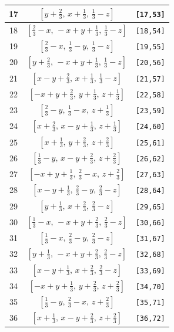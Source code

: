 \documentclass[fleqn,8pt]{jsarticle}
\begin{document}
\begin{longtable}{ccc}
17 & $\left[ y + \frac{2}{3},\, x + \frac{1}{3},\, \frac{1}{3} - z \right]$ & {\tt [17,53]} \\ \hline
18 & $\left[ \frac{2}{3} - x,\, - x + y + \frac{1}{3},\, \frac{1}{3} - z \right]$ & {\tt [18,54]} \\ \hline
19 & $\left[ \frac{2}{3} - x,\, \frac{1}{3} - y,\, \frac{1}{3} - z \right]$ & {\tt [19,55]} \\ \hline
20 & $\left[ y + \frac{2}{3},\, - x + y + \frac{1}{3},\, \frac{1}{3} - z \right]$ & {\tt [20,56]} \\ \hline
21 & $\left[ x - y + \frac{2}{3},\, x + \frac{1}{3},\, \frac{1}{3} - z \right]$ & {\tt [21,57]} \\ \hline
22 & $\left[ - x + y + \frac{2}{3},\, y + \frac{1}{3},\, z + \frac{1}{3} \right]$ & {\tt [22,58]} \\ \hline
23 & $\left[ \frac{2}{3} - y,\, \frac{1}{3} - x,\, z + \frac{1}{3} \right]$ & {\tt [23,59]} \\ \hline
24 & $\left[ x + \frac{2}{3},\, x - y + \frac{1}{3},\, z + \frac{1}{3} \right]$ & {\tt [24,60]} \\ \hline
25 & $\left[ x + \frac{1}{3},\, y + \frac{2}{3},\, z + \frac{2}{3} \right]$ & {\tt [25,61]} \\ \hline
26 & $\left[ \frac{1}{3} - y,\, x - y + \frac{2}{3},\, z + \frac{2}{3} \right]$ & {\tt [26,62]} \\ \hline
27 & $\left[ - x + y + \frac{1}{3},\, \frac{2}{3} - x,\, z + \frac{2}{3} \right]$ & {\tt [27,63]} \\ \hline
28 & $\left[ x - y + \frac{1}{3},\, \frac{2}{3} - y,\, \frac{2}{3} - z \right]$ & {\tt [28,64]} \\ \hline
29 & $\left[ y + \frac{1}{3},\, x + \frac{2}{3},\, \frac{2}{3} - z \right]$ & {\tt [29,65]} \\ \hline
30 & $\left[ \frac{1}{3} - x,\, - x + y + \frac{2}{3},\, \frac{2}{3} - z \right]$ & {\tt [30,66]} \\ \hline
31 & $\left[ \frac{1}{3} - x,\, \frac{2}{3} - y,\, \frac{2}{3} - z \right]$ & {\tt [31,67]} \\ \hline
32 & $\left[ y + \frac{1}{3},\, - x + y + \frac{2}{3},\, \frac{2}{3} - z \right]$ & {\tt [32,68]} \\ \hline
33 & $\left[ x - y + \frac{1}{3},\, x + \frac{2}{3},\, \frac{2}{3} - z \right]$ & {\tt [33,69]} \\ \hline
34 & $\left[ - x + y + \frac{1}{3},\, y + \frac{2}{3},\, z + \frac{2}{3} \right]$ & {\tt [34,70]} \\ \hline
35 & $\left[ \frac{1}{3} - y,\, \frac{2}{3} - x,\, z + \frac{2}{3} \right]$ & {\tt [35,71]} \\ \hline
36 & $\left[ x + \frac{1}{3},\, x - y + \frac{2}{3},\, z + \frac{2}{3} \right]$ & {\tt [36,72]} \\
\end{longtable}
\end{document}
